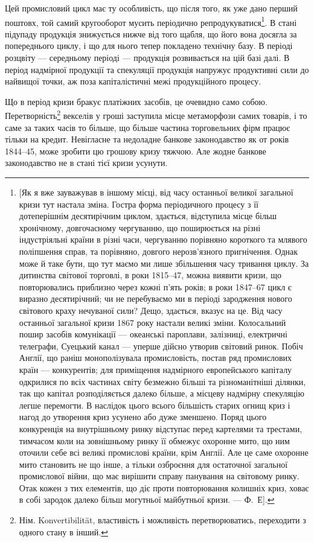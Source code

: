 Цей промисловий цикл має ту особливість, що після того, як уже дано перший
поштовх, той самий кругооборот мусить періодично репродукуватися\footnote{
[Як я вже зауважував в іншому місці, від часу останньої великої загальної кризи тут настала
зміна. Гостра форма періодичного процесу з її дотеперішнім десятирічним циклом, здається, відступила
місце більш хронічному, довгочасному чергуванню, що поширюється на різні індустріяльні країни в
різні
часи, чергуванню порівняно короткого та млявого поліпшення справ, та порівняно, довгого
нерозв'язного
пригнічення. Однак може й таке бути, що тут маємо ми лише збільшення часу тривання циклу. За
дитинства
світової торговлі, в роки 1815--47, можна виявити кризи, що повторювались приблизно через
кожні п’ять років; в роки 1847--67 цикл є виразно десятирічний; чи не перебуваємо ми в періоді
зародження нового світового краху нечуваної сили? Дещо, здається, вказує на це. Від часу останньої
загальної кризи 1867 року настали великі зміни. Колосальний пошир засобів комунікації — океанські
пароплави,
залізниці, електричні телеграфи, Суецький канал — уперше дійсно утворив світовий ринок. Побіч
Англії, що раніш монополізувала промисловість, постав ряд промислових країн — конкурентів; для
приміщення надмірного европейського капіталу одкрилися по всіх частинах світу безмежно більші та
різноманітніші ділянки, так що капітал розподіляється далеко більше, а місцеву надмірну спекуляцію
легше перемогти. В наслідок цього всього більшість старих огнищ криз і нагод до утворення криз
усунено
або дуже зменшено. Поряд цього конкуренція на внутрішньому ринку відступає перед картелями та
трестами, тимчасом коли на зовнішньому ринку її обмежує охоронне мито, що ним оточили себе всі
великі
промислові країни, крім Англії. Але це саме охоронне мито становить не що інше, а тільки озброєння
для остаточної загальної промислової війни, що має вирішити справу панування на світовому ринку.
Отак кожен з тих елементів, що діє проти повторювання колишніх криз, ховає в собі зародок далеко
більш могутньої майбутньої кризи. — Ф.~Е].
}. В стані
підупаду продукція знижується нижче від того щабля, що його вона досягла
за попереднього циклу, і що для нього тепер покладено технічну базу. В періоді
розцвіту — середньому періоді — продукція розвивається на цій базі далі. В період
надмірної продукції та спекуляції продукція напружує продуктивні сили до найвищої
точки, аж поза капіталістичні межі продукційного процесу.

Що в період кризи бракує платіжних засобів, це очевидно само собою.
Перетворність\footnote*{
Нім. Konvertibilität, властивість і можливість перетворюватись, переходити
з одного стану в інший. 
} векселів у гроші заступила місце метаморфози самих товарів,
і то саме за таких часів то більше, що більше частина торговельних фірм працює
тільки на кредит. Невігласне та недоладне банкове законодавство як от
років 1844--45, може зробити цю грошову кризу тяжчою. Але жодне банкове
законодавство не в стані тієї кризи усунути.

